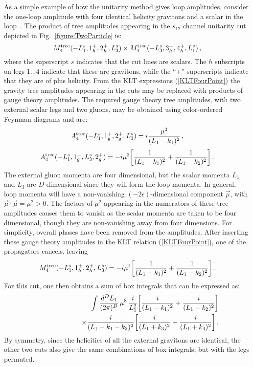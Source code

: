 As a simple example of how the unitarity method gives loop amplitudes,
consider the one-loop amplitude with four identical helicity gravitons
and a scalar in the loop~\cite{AllPlusGrav,MHVGrav}. The product of
tree amplitudes appearing in the $s_{12}$ channel unitarity cut
depicted in Fig.~\ref{figure:TwoParticle} is:
%
\begin{equation}
 M_4^{\rm tree}(-L_1^s, 1^+_h, 2^+_h, L_3^s) \times 
M_4^{\rm tree}(-L_3^s, 3^+_h, 4^+_h, L_1^s) \,, 
\end{equation}
%
where the superscript $s$ indicates that the cut lines are scalars.
The $h$ subscripts on legs $1\ldots 4$ indicate that these are gravitons,
while the ``$+$'' superscripts indicate that they are of plus helicity.
{}From the KLT expressions (\ref{KLTFourPoint}) the gravity tree
amplitudes appearing in the cuts may be replaced with products of
gauge theory amplitudes.  The required gauge theory tree amplitudes,
with two external scalar legs and two gluons, may be obtained
using color-ordered Feynman diagrams and are:
%
\begin{equation}
A_4^{\rm tree}(-L_1^s,1^+_g,2^+_g,L_3^s) =  i
{\mu^2 \over ( L_1 -k_1)^2} \,,
\end{equation}
%
\begin{equation}
 A_4^{\rm tree}(-L_1^s, 1^+_g, L_3^s, 2^+_g) 
 = - i {\mu^2} 
 \biggl[{1\over (L_1 -k_1)^2 }
 + {1\over (L_1 -k_2)^2}\biggr] \,.
\end{equation}
%
The external gluon momenta are four dimensional, but the scalar
momenta $L_1$ and $L_3$ are $D$ dimensional since they will form the
loop momenta. In general, loop momenta will have a non-vanishing
$(-2\epsilon)$-dimensional component $\vec{\mu}$, with
$\vec{\mu}\cdot\vec{\mu} = \mu^2 > 0$.  The factors of $\mu^2$
appearing in the numerators of these tree amplitudes causes them to
vanish as the scalar momenta are taken to be four dimensional, though
they are non-vanishing away from four dimensions.  For simplicity,
overall phases have been removed from the amplitudes.  After inserting
these gauge theory amplitudes in the KLT relation
(\ref{KLTFourPoint}), one of the propagators cancels, leaving
%
\begin{equation}
 M_4^{\rm tree}(-L_1^s, 1^+_h, 2^+_h, L_3^s) = 
- i \mu^4 
 \biggl[{1\over (L_1 -k_1)^2}
 + {1\over (L_1 -k_2)^2}  \biggr] \,.
\end{equation}
%
For this cut, one then obtains a sum of box integrals that 
can be expressed as:
%
\begin{eqnarray}
&& \int {d^D L_1 \over (2 \pi)^D} \, \mu^8 \, {i \over L_1^2} 
 \biggl[{i \over (L_1 -k_1)^2}
 + {i \over (L_1 -k_2)^2}  \biggr] \nonumber \\
&& \hskip 2 cm \times {i \over (L_1 - k_1 - k_2)^2}
 \biggl[{i \over (L_1 + k_3)^2}
 + {i \over (L_1 + k_4)^2}  \biggr] \,.
\end{eqnarray}
%
By symmetry, since the helicities of all the external gravitons are
identical, the other two cuts also give the same combinations of
box integrals, but with the legs permuted.

